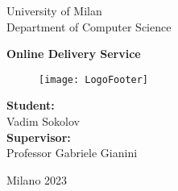 \begin{center}
    University of Milan\\
    Department of Computer Science\\
\end{center}

\vspace{24mm}

\begin{center}%
    \large{\textbf{Online Delivery Service}}\\
\end{center}

\begin{figure}[ht!]
	\centering
	\texttt{[image: LogoFooter]}
	\label{fig:LogoFooter}
\end{figure}

\vspace{80mm}

\hspace{100mm}
\begin{minipage}{0.4\textwidth}
    \begin{flushleft}
        \textbf{Student:}\\Vadim Sokolov\\
        \vspace{4mm}
        \textbf{Supervisor:}\\Professor Gabriele Gianini\\
        \vspace{4mm}
    \end{flushleft}
\end{minipage}

\vspace*{\fill}

\begin{center}
    Milano 2023
\end{center}

\thispagestyle{empty}